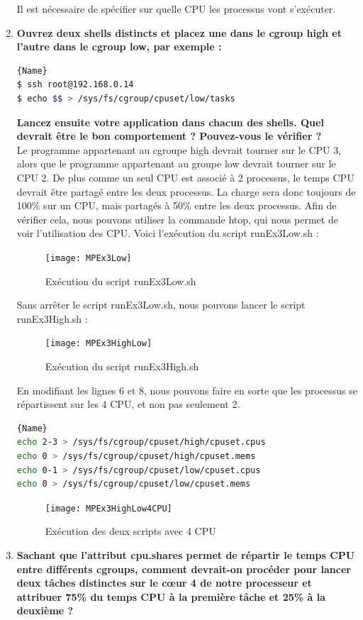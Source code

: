 \documentclass[
	a4paper, %
	10pt, %
]{CSUniSchoolLabReport}
\begin{document}
\begin{enumerate}[label=\textbf{\arabic*}]
	
	Il est n\'ecessaire de sp\'ecifier sur quelle CPU les processus vont s'ex\'ecuter.
	\item \textbf{Ouvrez deux shells distincts et placez une dans le cgroup high et l’autre dans le cgroup low, par exemple :}\\
\begin{lstlisting}[language=bash, firstnumber=1]{Name}
$ ssh root@192.168.0.14
$ echo $$ > /sys/fs/cgroup/cpuset/low/tasks
\end{lstlisting}
\textbf{Lancez ensuite votre application dans chacun des shells. Quel devrait être le bon comportement ? Pouvez-vous le vérifier ?}\\
Le programme appartenant au cgroupe high devrait tourner sur le CPU 3, alors que le programme appartenant au groupe low devrait tourner sur le CPU 2.
De plus comme un seul CPU est associé \`a 2 processus, le temps CPU devrait \^etre partagé entre les deux processus. La charge sera donc toujours de 100\% sur un CPU, mais partagés \`a 50\% entre les deux processus.
Afin de v\'erifier cela, nous pouvons utiliser la commande htop, qui nous permet de voir l'utilisation des CPU.
Voici l'ex\'ecution du script runEx3Low.sh :
\begin{figure}[H]
	\centering
	\texttt{[image: MPEx3Low]}
	\caption{Ex\'ecution du script runEx3Low.sh}
	\label{fig:MPEx3Low}
\end{figure}
Sans arr\^eter le script runEx3Low.sh, nous pouvons lancer le script runEx3High.sh :
\begin{figure}[H]
	\centering
	\texttt{[image: MPEx3HighLow]}
	\caption{Ex\'ecution du script runEx3High.sh}
	\label{fig:MPEx3High}
\end{figure}

En modifiant les lignes 6 et 8, nous pouvons faire en sorte que les processus se r\'epartissent sur les 4 CPU, et non pas seulement 2.
\begin{lstlisting}[language=bash, firstnumber=1]{Name}
echo 2-3 > /sys/fs/cgroup/cpuset/high/cpuset.cpus
echo 0 > /sys/fs/cgroup/cpuset/high/cpuset.mems
echo 0-1 > /sys/fs/cgroup/cpuset/low/cpuset.cpus
echo 0 > /sys/fs/cgroup/cpuset/low/cpuset.mems
\end{lstlisting}

\begin{figure}[H]
	\centering
	\texttt{[image: MPEx3HighLow4CPU]}
	\caption{Ex\'ecution des deux scripts avec 4 CPU}
	\label{fig:MPEx3HighLow4CPU}
\end{figure}


	\item \textbf{Sachant que l’attribut cpu.shares permet de répartir le temps CPU entre différents cgroups, comment devrait-on procéder pour lancer deux tâches distinctes sur le cœur 4 de notre processeur et attribuer 75\% du temps CPU à la première tâche et 25\% à la deuxième ?}\\


\end{enumerate}
\end{document}

